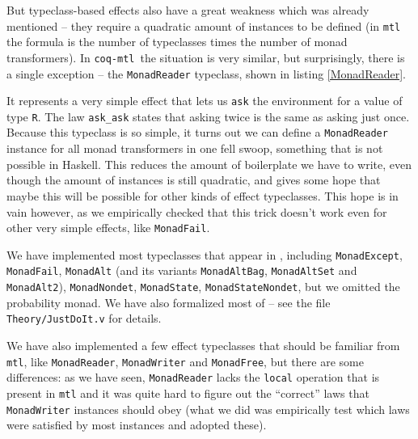 \documentclass[declaration,inz,english,shortabstract]{iithesis}
\newcommand{\libname}{\m{coq-mtl}}
\newcommand{\m}[1]{\texttt{#1}}
\begin{document}

But typeclass-based effects also have a great weakness which was already mentioned -- they require a quadratic amount of instances to be defined (in \m{mtl} the formula is the number of typeclasses times the number of monad transformers). In \libname\ the situation is very similar, but surprisingly, there is a single exception -- the \m{MonadReader} typeclass, shown in listing \ref{MonadReader}.

It represents a very simple effect that lets us \m{ask} the environment for a value of type \m{R}. The law \m{ask\_ask} states that asking twice is the same as asking just once. Because this typeclass is so simple, it turns out we can define a \m{MonadReader} instance for all monad transformers in one fell swoop, something that is not possible in Haskell. This reduces the amount of boilerplate we have to write, even though the amount of instances is still quadratic, and gives some hope that maybe this will be possible for other kinds of effect typeclasses. This hope is in vain however, as we empirically checked that this trick doesn't work even for other very simple effects, like \m{MonadFail}.

We have implemented most typeclasses that appear in \cite{JustDoIt}, including \m{MonadExcept}, \m{MonadFail}, \m{MonadAlt} (and its variants \m{MonadAltBag}, \m{MonadAltSet} and \m{MonadAlt2}), \m{MonadNondet}, \m{MonadState}, \m{MonadStateNondet}, but we omitted the probability monad. We have also formalized most of \cite{JustDoIt} -- see the file \m{Theory/JustDoIt.v} for details.

We have also implemented a few effect typeclasses that should be familiar from \m{mtl}, like \m{MonadReader}, \m{MonadWriter} and \m{MonadFree}, but there are some differences: as we have seen, \m{MonadReader} lacks the \m{local} operation that is present in \m{mtl} and it was quite hard to figure out the ``correct'' laws that \m{MonadWriter} instances should obey (what we did was empirically test which laws were satisfied by most instances and adopted these).
\end{document}

